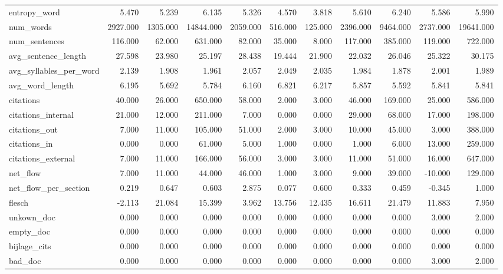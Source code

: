 \begin{tabular}{lrrrrrrrrrr}
\cline{1-11}
entropy\_word & 5.470 & 5.239 & 6.135 & 5.326 & 4.570 & 3.818 & 5.610 & 6.240 & 5.586 & 5.990 \\
\cline{1-11}
num\_words & 2927.000 & 1305.000 & 14844.000 & 2059.000 & 516.000 & 125.000 & 2396.000 & 9464.000 & 2737.000 & 19641.000 \\
\cline{1-11}
num\_sentences & 116.000 & 62.000 & 631.000 & 82.000 & 35.000 & 8.000 & 117.000 & 385.000 & 119.000 & 722.000 \\
\cline{1-11}
avg\_sentence\_length & 27.598 & 23.980 & 25.197 & 28.438 & 19.444 & 21.900 & 22.032 & 26.046 & 25.322 & 30.175 \\
\cline{1-11}
avg\_syllables\_per\_word & 2.139 & 1.908 & 1.961 & 2.057 & 2.049 & 2.035 & 1.984 & 1.878 & 2.001 & 1.989 \\
\cline{1-11}
avg\_word\_length & 6.195 & 5.692 & 5.784 & 6.160 & 6.821 & 6.217 & 5.857 & 5.592 & 5.841 & 5.841 \\
\cline{1-11}
citations & 40.000 & 26.000 & 650.000 & 58.000 & 2.000 & 3.000 & 46.000 & 169.000 & 25.000 & 586.000 \\
\cline{1-11}
citations\_internal & 21.000 & 12.000 & 211.000 & 7.000 & 0.000 & 0.000 & 29.000 & 68.000 & 17.000 & 198.000 \\
\cline{1-11}
citations\_out & 7.000 & 11.000 & 105.000 & 51.000 & 2.000 & 3.000 & 10.000 & 45.000 & 3.000 & 388.000 \\
\cline{1-11}
citations\_in & 0.000 & 0.000 & 61.000 & 5.000 & 1.000 & 0.000 & 1.000 & 6.000 & 13.000 & 259.000 \\
\cline{1-11}
citations\_external & 7.000 & 11.000 & 166.000 & 56.000 & 3.000 & 3.000 & 11.000 & 51.000 & 16.000 & 647.000 \\
\cline{1-11}
net\_flow & 7.000 & 11.000 & 44.000 & 46.000 & 1.000 & 3.000 & 9.000 & 39.000 & -10.000 & 129.000 \\
\cline{1-11}
net\_flow\_per\_section & 0.219 & 0.647 & 0.603 & 2.875 & 0.077 & 0.600 & 0.333 & 0.459 & -0.345 & 1.000 \\
\cline{1-11}
flesch & -2.113 & 21.084 & 15.399 & 3.962 & 13.756 & 12.435 & 16.611 & 21.479 & 11.883 & 7.950 \\
\cline{1-11}
unkown\_doc & 0.000 & 0.000 & 0.000 & 0.000 & 0.000 & 0.000 & 0.000 & 0.000 & 3.000 & 2.000 \\
\cline{1-11}
empty\_doc & 0.000 & 0.000 & 0.000 & 0.000 & 0.000 & 0.000 & 0.000 & 0.000 & 0.000 & 0.000 \\
\cline{1-11}
bijlage\_cits & 0.000 & 0.000 & 0.000 & 0.000 & 0.000 & 0.000 & 0.000 & 0.000 & 0.000 & 0.000 \\
\cline{1-11}
bad\_doc & 0.000 & 0.000 & 0.000 & 0.000 & 0.000 & 0.000 & 0.000 & 0.000 & 3.000 & 2.000 \\
\cline{1-11}
\bottomrule
\end{tabular}
